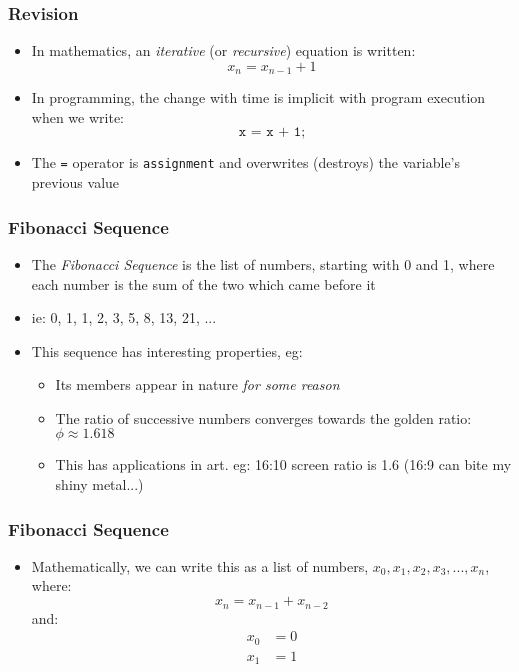 \documentclass[14pt]{beamer}
\begin{document}
\begin{frame}
\frametitle{Revision}
\begin{itemize}
\item In mathematics, an \textit{iterative} (or \textit{recursive}) equation is written:
\begin{equation}
x_n = x_{n-1} + 1
\end{equation}
\item In programming, the change with time is implicit with program execution when we write:\\
\begin{equation}
\texttt{x = x + 1;}
\end{equation}
\item The \texttt{=} operator is \texttt{assignment} and overwrites (destroys) the variable's previous value
\end{itemize}
\end{frame}

\begin{frame}
\frametitle{Fibonacci Sequence}
\begin{itemize}
\item The \textit{Fibonacci Sequence} is the list of numbers, starting with 0 and 1, where each number is the sum of the two which came before it

\item ie: 0, 1, 1, 2, 3, 5, 8, 13, 21, ...

\item This sequence has interesting properties, eg:
	\begin{itemize}
		\item Its members appear in nature \textit{for some reason}
		\item The ratio of successive numbers converges towards the golden ratio: $\phi \approx 1.618$
		\item This has applications in art. eg: 16:10 screen ratio is 1.6 (16:9 can bite my shiny metal...)
	\end{itemize}
\end{itemize}
\end{frame}

\begin{frame}
\frametitle{Fibonacci Sequence}
\begin{itemize}
\item Mathematically, we can write this as a list of numbers, $x_0,x_1, x_2, x_3, ... , x_n$, where:
\begin{equation}
x_n = x_{n-1} + x_{n-2}
\end{equation}
and:
\begin{align}
x_0 &= 0\\
x_1 &= 1
\end{align}
\end{itemize}
\end{frame}
\end{document}
